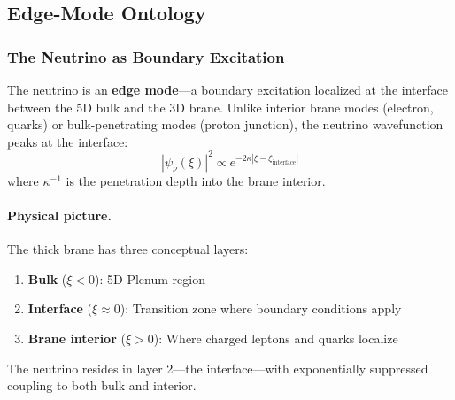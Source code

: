 \subsection{Edge-Mode Ontology}
\label{sec:ch6_ontology}

\subsubsection{The Neutrino as Boundary Excitation}

\begin{postulate}
\label{post:ch6_neutrino_edge}
The neutrino is an \textbf{edge mode}---a boundary excitation localized at the
interface between the 5D bulk and the 3D brane. Unlike interior brane modes
(electron, quarks) or bulk-penetrating modes (proton junction), the neutrino
wavefunction peaks at the interface:
\begin{equation}
    |\psi_\nu(\xi)|^2 \propto e^{-2\kappa |\xi - \xi_{\text{interface}}|}
    \label{eq:ch6_edge_profile}
\end{equation}
where $\kappa^{-1}$ is the penetration depth into the brane interior.
\end{postulate}

\paragraph{Physical picture.}
The thick brane has three conceptual layers:
\begin{enumerate}[nosep]
    \item \textbf{Bulk} ($\xi < 0$): 5D Plenum region
    \item \textbf{Interface} ($\xi \approx 0$): Transition zone where boundary conditions apply
    \item \textbf{Brane interior} ($\xi > 0$): Where charged leptons and quarks localize
\end{enumerate}
The neutrino resides in layer 2---the interface---with exponentially suppressed
coupling to both bulk and interior.

